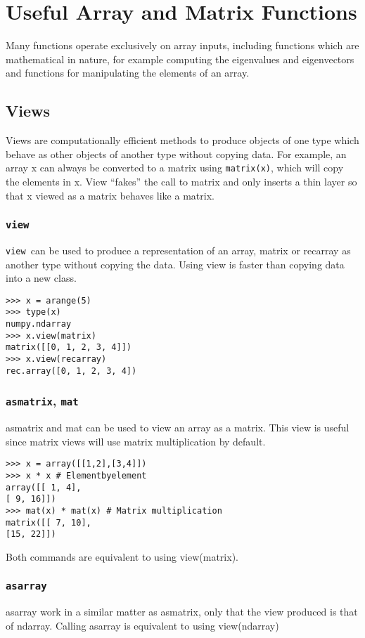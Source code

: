 \documentclass[KSmain.tex]{subfiles}
\begin{document}
 

\section{Useful Array and Matrix Functions}
Many functions operate exclusively on array inputs, including functions which are mathematical in nature,
for example computing the eigenvalues and eigenvectors and functions for manipulating the elements
of an array.

\subsection{Views}
Views are computationally efficient methods to produce objects of one type which behave as other objects
of another type without copying data. For example, an array x can always be converted to a matrix using
\texttt{matrix(x)}, which will copy the elements in x. View “fakes” the call to matrix and only inserts a thin layer
so that x viewed as a matrix behaves like a matrix.
\subsubsection{\texttt{view}}
\texttt{view }can be used to produce a representation of an array, matrix or recarray as another type without copying
the data. Using view is faster than copying data into a new class.
\begin{framed}
\begin{verbatim}
>>> x = arange(5)
>>> type(x)
numpy.ndarray
>>> x.view(matrix)
matrix([[0, 1, 2, 3, 4]])
>>> x.view(recarray)
rec.array([0, 1, 2, 3, 4])
\end{verbatim}
\end{framed}
\subsubsection{\texttt{asmatrix}, \texttt{mat}}
asmatrix and mat can be used to view an array as a matrix. This view is useful since matrix views will use
matrix multiplication by default.
\begin{framed}
\begin{verbatim}
>>> x = array([[1,2],[3,4]])
>>> x * x # Elementbyelement
array([[ 1, 4],
[ 9, 16]])
>>> mat(x) * mat(x) # Matrix multiplication
matrix([[ 7, 10],
[15, 22]])
\end{verbatim}
\end{framed}
Both commands are equivalent to using view(matrix).
\subsubsection{\texttt{asarray}}
asarray work in a similar matter as asmatrix, only that the view produced is that of ndarray. Calling
asarray is equivalent to using view(ndarray)
\end{document}
